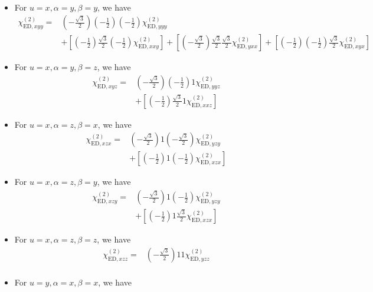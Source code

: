 \documentclass[UTF8,10pt,a4paper]{article}
\begin{document}
\begin{itemize}
\begin{align}
\end{align}\normalsize
\item For $u=x,\alpha=y,\beta=y$, we have
\small\begin{align}
\nonumber\chi_{\text{ED},xyy}^{(2)}=&\left(-\frac{\sqrt{3}}{2}\right)\left(-\frac{1}{2}\right)\left(-\frac{1}{2}\right)\chi_{\text{ED},yyy}^{(2)}\\
&+\left[\left(-\frac{1}{2}\right)\frac{\sqrt{3}}{2}\left(-\frac{1}{2}\right)\chi_{\text{ED},xxy}^{(2)}\right]+\left[\left(-\frac{\sqrt{3}}{2}\right)\frac{\sqrt{3}}{2}\frac{\sqrt{3}}{2}\chi_{\text{ED},yxx}^{(2)}\right]+\left[\left(-\frac{1}{2}\right)\left(-\frac{1}{2}\right)\frac{\sqrt{3}}{2}\chi_{\text{ED},xyx}^{(2)}\right]
\end{align}\normalsize
\item For $u=x,\alpha=y,\beta=z$, we have
\small\begin{align}
\nonumber\chi_{\text{ED},xyz}^{(2)}=&\left(-\frac{\sqrt{3}}{2}\right)\left(-\frac{1}{2}\right)1\chi_{\text{ED},yyz}^{(2)}\\
&+\left[\left(-\frac{1}{2}\right)\frac{\sqrt{3}}{2}1\chi_{\text{ED},xxz}^{(2)}\right]
\end{align}\normalsize
\item For $u=x,\alpha=z,\beta=x$, we have
\small\begin{align}
\nonumber\chi_{\text{ED},xzx}^{(2)}=&\left(-\frac{\sqrt{3}}{2}\right)1\left(-\frac{\sqrt{3}}{2}\right)\chi_{\text{ED},yzy}^{(2)}\\
&+\left[\left(-\frac{1}{2}\right)1\left(-\frac{1}{2}\right)\chi_{\text{ED},xzx}^{(2)}\right]
\end{align}\normalsize
\item For $u=x,\alpha=z,\beta=y$, we have
\small\begin{align}
\nonumber\chi_{\text{ED},xzy}^{(2)}=&\left(-\frac{\sqrt{3}}{2}\right)1\left(-\frac{1}{2}\right)\chi_{\text{ED},yzy}^{(2)}\\
&+\left[\left(-\frac{1}{2}\right)1\frac{\sqrt{3}}{2}\chi_{\text{ED},xzx}^{(2)}\right]
\end{align}\normalsize
\item For $u=x,\alpha=z,\beta=z$, we have
\small\begin{align}
\nonumber\chi_{\text{ED},xzz}^{(2)}=&\left(-\frac{\sqrt{3}}{2}\right)11\chi_{\text{ED},yzz}^{(2)}\\
&
\end{align}\normalsize
\item For $u=y,\alpha=x,\beta=x$, we have
\small\begin{align}

\end{align}
\end{itemize}
\end{document}
